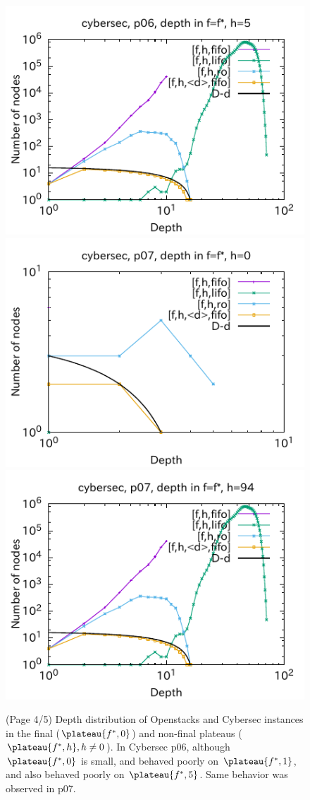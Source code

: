 \begin{figure}[htbp]
\includegraphics{img/output-lmcut/cybersec/p06-5.pdf}
\includegraphics{img/output-lmcut/cybersec/p07-0.pdf}
\includegraphics{img/output-lmcut/cybersec/p07-94.pdf}
 \caption{(Page 4/5) Depth distribution of Openstacks and Cybersec instances in the final ($\plateau{f^*,0}$) and non-final plateaus ($\plateau{f^*,h}, h\not=0$). In Cybersec p06, although $\plateau{f^*,0}$ is small, \fifo and \ro behaved poorly on $\plateau{f^*,1}$, and also \lifo behaved poorly on $\plateau{f^*,5}$. Same behavior was observed in p07.}
 \label{fig:depth-histogram4}
\end{figure}
